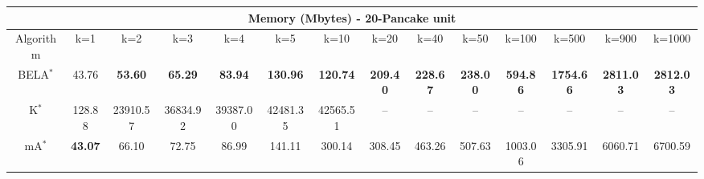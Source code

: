 \begin{tabular}{c|ccccccccccccc}\toprule
\multicolumn{14}{c}{Memory (Mbytes) - 20-Pancake unit}\\ \midrule
Algorithm & k=1 & k=2 & k=3 & k=4 & k=5 & k=10 & k=20 & k=40 & k=50 & k=100 & k=500 & k=900 & k=1000 \\ \midrule
BELA$^*$ & 43.76 & \textbf{53.60} & \textbf{65.29} & \textbf{83.94} & \textbf{130.96} & \textbf{120.74} & \textbf{209.40} & \textbf{228.67} & \textbf{238.00} & \textbf{594.86} & \textbf{1754.66} & \textbf{2811.03} & \textbf{2812.03} \\
K$^*$ & 128.88 & 23910.57 & 36834.92 & 39387.00 & 42481.35 & 42565.51 & -- & -- & -- & -- & -- & -- & -- \\
mA$^*$ & \textbf{43.07} & 66.10 & 72.75 & 86.99 & 141.11 & 300.14 & 308.45 & 463.26 & 507.63 & 1003.06 & 3305.91 & 6060.71 & 6700.59 \\ \bottomrule 
\end{tabular}
